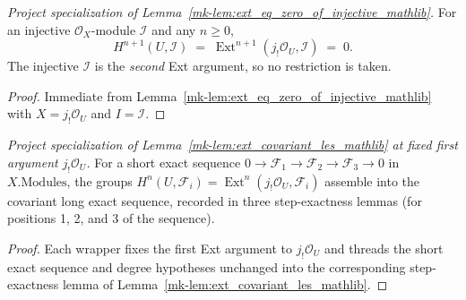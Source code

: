 \begin{lemma}\label{mk-lem:absolute_cohomology_injective_vanishing}
  \leanok

  \textit{Project specialization of Lemma~\ref{mk-lem:ext_eq_zero_of_injective_mathlib}.}
  For an injective \(\mathcal{O}_X\)-module \(\mathcal{I}\) and any \(n \geq 0\),
  \[
    H^{n+1}(U, \mathcal{I}) \;=\; \operatorname{Ext}^{n+1}(j_!\mathcal{O}_U, \mathcal{I}) \;=\; 0.
  \]
  The injective \(\mathcal{I}\) is the \emph{second} Ext argument, so no restriction is taken.
\end{lemma}
\begin{proof}
  \leanok
  Immediate from Lemma~\ref{mk-lem:ext_eq_zero_of_injective_mathlib} with \(X = j_!\mathcal{O}_U\) and
  \(I = \mathcal{I}\).
\end{proof}

\begin{lemma}
  \label{mk-lem:absolute_cohomology_covariant_les}

  \textit{Project specialization of Lemma~\ref{mk-lem:ext_covariant_les_mathlib} at fixed first
  argument \(j_!\mathcal{O}_U\).}
  For a short exact sequence \(0 \to \mathcal{F}_1 \to \mathcal{F}_2 \to \mathcal{F}_3 \to 0\) in
  \(X.\mathrm{Modules}\), the groups \(H^n(U, \mathcal{F}_i) = \operatorname{Ext}^n(j_!
  \mathcal{O}_U, \mathcal{F}_i)\) assemble into the covariant long exact sequence, recorded in
  three step-exactness lemmas (for positions 1, 2, and 3 of the sequence).
\end{lemma}
\begin{proof}
  Each wrapper fixes the first Ext argument to \(j_!\mathcal{O}_U\) and threads the short exact
  sequence and degree hypotheses unchanged into the corresponding step-exactness lemma of
  Lemma~\ref{mk-lem:ext_covariant_les_mathlib}.
\end{proof}

